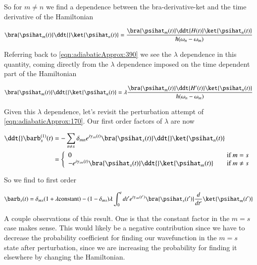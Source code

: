 So for $m \ne n$ we find a dependence between the bra-derivative-ket and the time derivative of the Hamiltonian

\begin{equation}\label{eqn:adiabaticApprox:410}
\bra{\psihat_m(t)}
\ddt{} \ket{\psihat_n(t)} 
=
\frac{
\bra{\psihat_m(t)}
\ddt{H(t)} \ket{\psihat_n(t)} 
}
{
\hbar (\omega_n - \omega_m) 
}
\end{equation}

Referring back to \ref{eqn:adiabaticApprox:390} we see the $\lambda$ dependence in this quantity, coming directly from the $\lambda$ dependence imposed on the time dependent part of the Hamiltonian

\begin{equation}\label{eqn:adiabaticApprox:430}
\bra{\psihat_m(t)}
\ddt{} \ket{\psihat_n(t)} 
=
\lambda
\frac{
\bra{\psihat_m(t)}
\ddt{H'(t)} \ket{\psihat_n(t)} 
}
{
\hbar (\omega_n - \omega_m) 
}
\end{equation}

Given this $\lambda$ dependence, let's revisit the perturbation attempt of \ref{eqn:adiabaticApprox:170}.  Our first order factors of $\lambda$ are now

\begin{align*}
\ddt{} \barb_s^{(1)}(t) 
&= - \sum_{n \ne s} \delta_{mn} e^{i \gamma_{sn}(t) } \bra{\psihat_s(t)} \ddt{} \ket{\psihat_n(t)} \\
&= 
\left\{
\begin{array}{l l}
0 & 
\quad \mbox{if $m = s$} \\
- e^{i \gamma_{sm}(t) } \bra{\psihat_s(t)} \ddt{} \ket{\psihat_m(t)} &
\quad \mbox{if $m \ne s$} \\
\end{array}
\right.
\end{align*}

So we find to first order

\begin{equation}\label{eqn:adiabaticApprox:450}
\barb_s(t) 
=
\delta_{ms}(1 + \lambda \text{constant})
- 
(1-\delta_{ms}) \lambda
\int_0^t dt'
e^{i \gamma_{sm}(t') } \bra{\psihat_s(t')} \frac{d}{dt'} \ket{\psihat_m(t')} 
\end{equation}

A couple observations of this result.  One is that the constant factor in the $m = s$ case makes sense.  This would likely be a negative contribution since we have to decrease the probability coefficient for finding our wavefunction in the $m = s$ state after perturbation, since we are increasing the probability for finding it elsewhere by changing the Hamiltonian.

